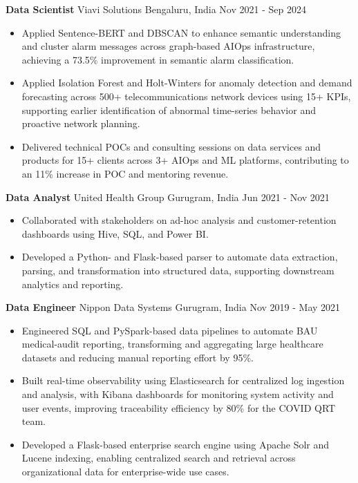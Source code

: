 \documentclass[10pt,a4paper]{article}
\newcommand{\role}[4]{\textbf{#1} \textbar{} #2 \hfill #3 \textbar{} #4\par}
\begin{document}
\vspace{3pt}
\role{Data Scientist}{Viavi Solutions}{Bengaluru, India}{Nov 2021 - Sep 2024}
\begin{itemize}
  \item Applied Sentence-BERT and DBSCAN to enhance semantic understanding and cluster alarm messages across graph-based AIOps infrastructure, achieving a 73.5\% improvement in semantic alarm classification.
  \item Applied Isolation Forest and Holt-Winters for anomaly detection and demand forecasting across 500+ telecommunications network devices using 15+ KPIs, supporting earlier identification of abnormal time-series behavior and proactive network planning.
  \item Delivered technical POCs and consulting sessions on data services and products for 15+ clients across 3+ AIOps and ML platforms, contributing to an 11\% increase in POC and mentoring revenue.
\end{itemize}
\vspace{3pt}
\role{Data Analyst}{United Health Group}{Gurugram, India}{Jun 2021 - Nov 2021}
\begin{itemize}
  \item Collaborated with stakeholders on ad-hoc analysis and customer-retention dashboards using Hive, SQL, and Power BI.
  \item Developed a Python- and Flask-based parser to automate data extraction, parsing, and transformation into structured data, supporting downstream analytics and reporting.
\end{itemize}
\vspace{3pt}
\role{Data Engineer}{Nippon Data Systems}{Gurugram, India}{Nov 2019 - May 2021}
\begin{itemize}
  \item Engineered SQL and PySpark-based data pipelines to automate BAU medical-audit reporting, transforming and aggregating large healthcare datasets and reducing manual reporting effort by 95\%.
  \item Built real-time observability using Elasticsearch for centralized log ingestion and analysis, with Kibana dashboards for monitoring system activity and user events, improving traceability efficiency by 80\% for the COVID QRT team.
  \item Developed a Flask-based enterprise search engine using Apache Solr and Lucene indexing, enabling centralized search and retrieval across organizational data for enterprise-wide use cases.
\end{itemize}
\end{document}
